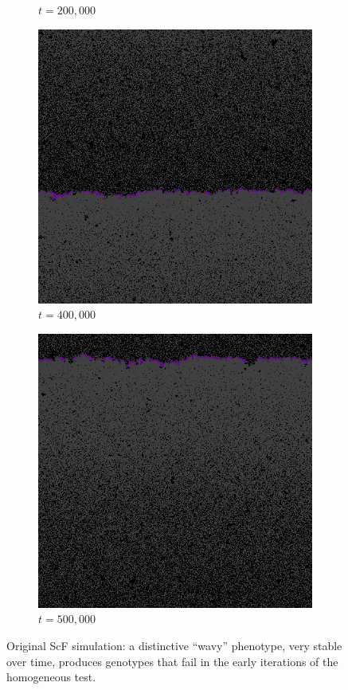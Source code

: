 \begin{figure}
\begin{subfigure}{.12\textwidth}
 \caption{$t=200,000$}
\end{subfigure}%
\begin{subfigure}{.12\textwidth}
 \centering
 \includegraphics[width=1\linewidth]{img/sm400000}
 \caption{$t=400,000$}
\end{subfigure}%
\begin{subfigure}{.12\textwidth}
 \centering
 \includegraphics[width=1\linewidth]{img/sm500000}
 \caption{$t=500,000$}
\end{subfigure}
\caption{Original ScF simulation: a distinctive ``wavy'' phenotype, very stable over time, produces genotypes that fail in the early iterations of the homogeneous test.}
\label{fig:smalldistinctive}
\end{figure}
